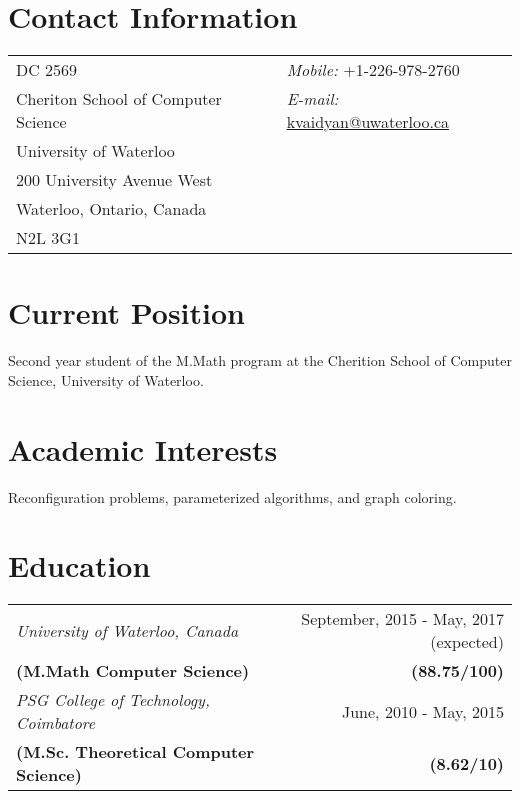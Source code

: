 \documentclass[margin,line]{res}
\begin{document}

\begin{resume}
\section{\sc Contact Information}
\vspace{.05in}
\begin{tabular}{l l}
DC 2569				    & {\it Mobile:} +1-226-978-2760\\ 
Cheriton School of Computer Science  & {\it E-mail:}  \href{mailto:kvaidyan@uwaterloo.ca}{kvaidyan@uwaterloo.ca}\\    
University of Waterloo	             & \\
200 University Avenue West           & \\
Waterloo, Ontario, Canada	         & \\
N2L 3G1     
\end{tabular}

\section{\sc Current Position}
Second year student of the M.Math program at the Cherition School of Computer Science, University of Waterloo.

\section{\sc Academic Interests}
Reconfiguration problems, parameterized algorithms, and graph coloring. 
\section{\sc Education}
\begin{tabular}{l r}
\textit{University of Waterloo, Canada} & September, 2015 - May, 2017 (expected)\\
  \textbf{(M.Math Computer Science)} & \textbf{(88.75/100)}\\ 
\textit{PSG College of Technology, Coimbatore} & June, 2010 - May, 2015 \\
\textbf{(M.Sc. Theoretical Computer Science)} & \textbf{(8.62/10)}\\
\end{tabular}


\end{resume}
\end{document}
